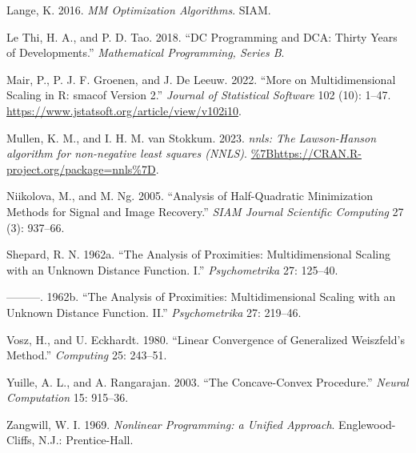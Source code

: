 \documentclass[
  12pt,
]{article}
\newlength{\cslhangindent}
\newenvironment{CSLReferences}[2] %
 {\begin{list}{}{%
  \setlength{\itemindent}{0pt}
  \setlength{\leftmargin}{0pt}
  \setlength{\parsep}{0pt}
  \ifodd #1
   \setlength{\leftmargin}{\cslhangindent}
   \setlength{\itemindent}{-1\cslhangindent}
  \fi
  \setlength{\itemsep}{#2\baselineskip}}}
 {\end{list}}
\begin{document}
\begin{CSLReferences}{1}{0}
Lange, K. 2016. \emph{MM Optimization Algorithms}. SIAM.

Le Thi, H. A., and P. D. Tao. 2018. {``{DC Programming and DCA: Thirty Years of Developments}.''} \emph{Mathematical Programming, Series B}.

Mair, P., P. J. F. Groenen, and J. De Leeuw. 2022. {``{More on Multidimensional Scaling in R: smacof Version 2}.''} \emph{Journal of Statistical Software} 102 (10): 1--47. \url{https://www.jstatsoft.org/article/view/v102i10}.

Mullen, K. M., and I. H. M. van Stokkum. 2023. \emph{{nnls: The Lawson-Hanson algorithm for non-negative least squares (NNLS)}}. \url{\%7Bhttps://CRAN.R-project.org/package=nnls\%7D}.

Niikolova, M., and M. Ng. 2005. {``Analysis of Half-Quadratic Minimization Methods for Signal and Image Recovery.''} \emph{SIAM Journal Scientific Computing} 27 (3): 937--66.

Shepard, R. N. 1962a. {``{The Analysis of Proximities: Multidimensional Scaling with an Unknown Distance Function. I}.''} \emph{Psychometrika} 27: 125--40.

---------. 1962b. {``{The Analysis of Proximities: Multidimensional Scaling with an Unknown Distance Function. II}.''} \emph{Psychometrika} 27: 219--46.

Vosz, H., and U. Eckhardt. 1980. {``{Linear Convergence of Generalized {W}eiszfeld's Method}.''} \emph{Computing} 25: 243--51.

Yuille, A. L., and A. Rangarajan. 2003. {``{The Concave-Convex Procedure}.''} \emph{Neural Computation} 15: 915--36.

Zangwill, W. I. 1969. \emph{{Nonlinear Programming: a Unified Approach}}. Englewood-Cliffs, N.J.: Prentice-Hall.

\end{CSLReferences}
\end{document}
